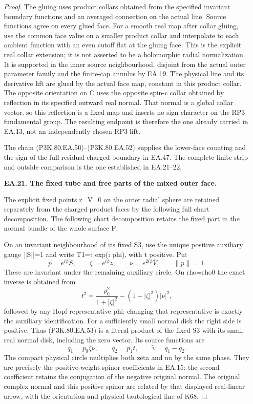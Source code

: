 \begin{proof}
The gluing uses product collars obtained from the specified
invariant boundary functions and an averaged connection on
the actual line. Source functions agree on every glued face.
For a smooth real map after collar gluing, use the common face
value on a smaller product collar and interpolate to each
ambient function with an even cutoff flat at the gluing face.
This is the explicit real collar extension; it is not asserted
to be a holomorphic radial normalization. It is supported in
the inner source neighbourhood, disjoint from the actual
outer parameter family and the finite-cap annulus by EA.19.
The physical line and its derivative lift are glued by the
actual face map, constant in this product collar. The opposite
orientation on C uses the opposite spin-c collar obtained by
reflection in its specified outward real normal. That normal
is a global collar vector, so this reflection is a fixed map
and inserts no sign character on the RP3 fundamental group.
The resulting endpoint is therefore the one already carried
in EA.13, not an independently chosen RP3 lift.

The chain (P3K.80.EA.50)--(P3K.80.EA.52) supplies the lower-face counting
and the sign of the full residual charged boundary in EA.47.
The complete finite-strip and outside comparison is the one established in EA.21--22.

\par\medskip\noindent\textbf{EA.21. The fixed tube and free parts of the mixed outer face.}\par\nopagebreak[4]

The explicit fixed points z=V=0 on the outer radial sphere are retained separately from the charged product faces by the following full chart decomposition.
The following chart decomposition retains the fixed part in
the normal bundle of the whole surface F.

On an invariant neighbourhood of its fixed S3, use the unique
positive auxiliary gauge ||S||=1 and write T1=t exp(i phi),
with t positive. Put
\[
 p=e^{i\phi}S,\qquad \zeta=e^{i\phi}z,\qquad
 \nu=e^{2i\phi}\overline V,\qquad \|p\|=1 .
 \tag{P3K.80.EA.53}
\]
These are invariant under the remaining auxiliary circle.
On rho=rho0 the exact inverse is obtained from
\[
 t^2=\frac{\rho_0^2}{1+|\zeta|^2}
                  -(1+|\zeta|^2)|\nu|^2 ,
 \tag{P3K.80.EA.54}
\]
followed by any Hopf representative phi; changing that
representative is exactly the auxiliary identification.
For a sufficiently small normal disk the right side is positive.
Thus (P3K.80.EA.53) is a literal product of the fixed S3 with its
small real normal disk, including the zero vector. Its source
functions are
\[
 q_1=p_0\zeta\overline\nu,\qquad q_2=p_1t,\qquad
 \widetilde v=q_1-q_2 .
 \tag{P3K.80.EA.55}
\]
The compact physical circle multiplies both zeta and nu by
the same phase. They are precisely the positive-weight
spinor coefficients in EA.15; the second coefficient retains
the conjugation of the negative original normal. The
original complex normal and this positive spinor are related
by that displayed real-linear arrow, with the orientation
and physical tautological line of K68.


\end{proof}
